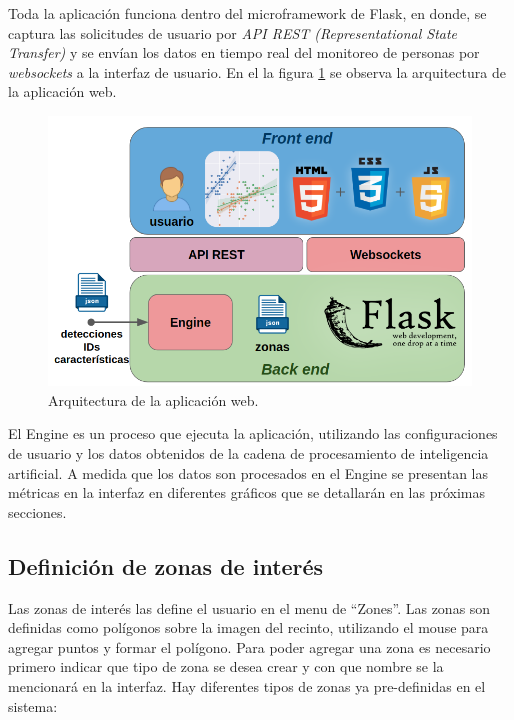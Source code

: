 Toda la aplicación funciona dentro del microframework de Flask, en donde, se captura las solicitudes de usuario por \textit{API REST (Representational 
State Transfer)} \citep{API_REST} y se envían los datos en tiempo real del monitoreo de personas por \textit{websockets} \citep{WEBSOCKETS} a la interfaz de usuario. En el la figura \ref{fig:arquitecturaWebApp} se observa la arquitectura de la aplicación web.

\begin{figure}[ht]
	\centering
	\includegraphics[scale=.6]{./Figures/arquitecturaWebApp.png}
	\caption{Arquitectura de la aplicación web.}
	\label{fig:arquitecturaWebApp}
\end{figure}

El Engine es un proceso que ejecuta la aplicación, utilizando las configuraciones de usuario y los datos obtenidos de la cadena de procesamiento de inteligencia artificial. A medida que los datos son procesados en el Engine se presentan las métricas en la interfaz en diferentes gráficos que se detallarán en las próximas secciones.

\newpage

\subsection{Definición de zonas de interés}

Las zonas de interés las define el usuario en el menu de ``Zones''. Las zonas son definidas como polígonos sobre la imagen del recinto, utilizando el mouse para agregar puntos y formar el polígono. Para poder agregar una zona es necesario primero indicar que tipo de zona se desea crear y con que nombre se la mencionará en la interfaz. Hay diferentes tipos de zonas ya pre-definidas en el sistema:

